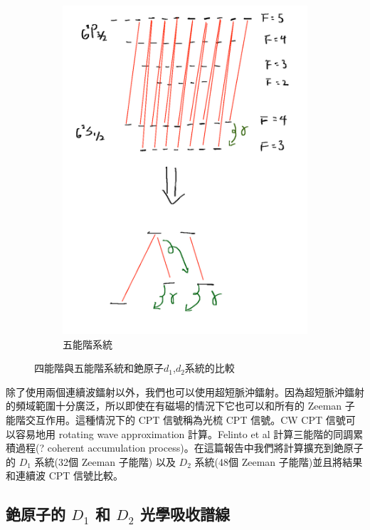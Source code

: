 \documentclass[11pt,a4paper]{article}
\begin{document}
\begin{figure}[H]
\begin{subfigure}[b]{0.3\textwidth}
\includegraphics[width=\textwidth]{small_system/five.pdf}
\caption{五能階系統}
\label{fig:five_level}
\end{subfigure}
\caption{四能階與五能階系統和銫原子$d_1$,$d_2$系統的比較}
\label{fig:analog}
\end{figure}

除了使用兩個連續波鐳射以外，我們也可以使用超短脈沖鐳射。因為超短脈沖鐳射的頻域範圍十分廣泛，所以即使在有磁場的情況下它也可以和所有的 Zeeman 子能階交互作用。這種情況下的 CPT 信號稱為光梳 CPT 信號。CW CPT 信號可以容易地用 rotating wave approximation 計算\cite{Vanier1998}\cite{Orriols1979}。Felinto et al 計算三能階的同調累積過程(? coherent accumulation process)\cite{Felinto2004}。在這篇報告中我們將計算擴充到銫原子的 $D_1$ 系統(32個 Zeeman 子能階) 以及 $D_2$ 系統(48個 Zeeman 子能階)並且將結果和連續波 CPT 信號比較。\\

\subsection{銫原子的 $D_1$ 和 $D_2$ 光學吸收譜線}
\end{document}
